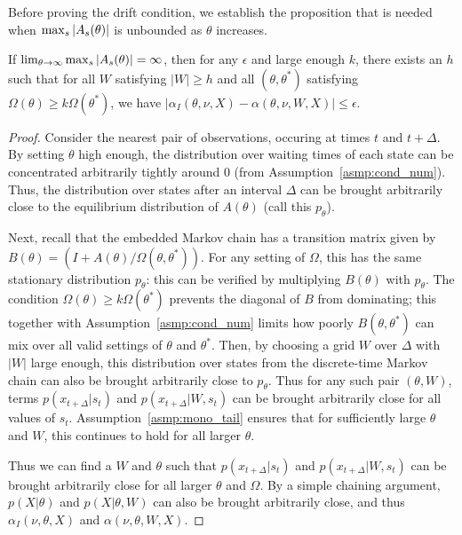 \noindent Before proving the drift condition, we establish the proposition that
is needed when ${\max_s |A_s(\theta)|}$ is unbounded as $\theta$ increases.
\begin{proposition}
  If $\lim_{\theta\rightarrow\infty} {\max_s |A_s(\theta)|} = \infty$, then 
for any $\epsilon$ and large enough $k$, there exists an $h$ such that for 
all $W$ satisfying $|W|\ge h$ and all $(\theta,\theta^*)$ satisfying
$\Omega(\theta) \ge k\Omega(\theta^*)$, we have 
$|\alpha_I(\theta,\nu,X) - \alpha(\theta,\nu,W,X)| \le \epsilon$.
\end{proposition}
\begin{proof}
  Consider the nearest pair of observations, occuring at times $t$ and 
  $t + \Delta$. %
  By setting $\theta$ high enough, the distribution over waiting times 
  of each state can be concentrated arbitrarily tightly around
  $0$ (from Assumption~\ref{asmp:cond_num}). Thus, the distribution over states after an 
  interval $\Delta$ can be brought arbitrarily close to the equilibrium 
  distribution of $A(\theta)$  (call this $p_{\theta}$).

  Next, recall that the embedded Markov chain has a transition matrix 
  given by $B(\theta) = (I + A(\theta)/\Omega(\theta,\theta^*))$. 
  For any setting of $\Omega$, this has the same stationary distribution 
  $p_{\theta}$: this can be verified by multiplying $B(\theta)$ with 
  $p_\theta$.
  The condition $\Omega(\theta) \ge k\Omega(\theta^*)$ prevents the
  diagonal of $B$ from dominating; this together with
  Assumption~\ref{asmp:cond_num} limits how poorly $B(\theta,\theta^*)$ 
  can mix over all valid settings of $\theta$ and $\theta^*$. Then,
  by choosing a grid $W$ over $\Delta$ with $|W|$ large enough, this 
  distribution over states from the discrete-time Markov chain can also be 
  brought arbitrarily close to $p_{\theta}$. Thus for any such pair 
  $(\theta,W)$, terms $p(x_{t+\Delta}|s_t)$ and $p(x_{t+\Delta}|W,s_t)$ 
  can be brought arbitrarily close for all values of $s_t$. 
  Assumption~\ref{asmp:mono_tail} ensures that
  for sufficiently large $\theta$ and $W$, this continues to hold for
  all larger $\theta$. 
 
  Thus we can find a $W$ and $\theta$ such that $p(x_{t+\Delta}|s_t)$ and 
  $p(x_{t+\Delta}|W,s_t)$ can be brought arbitrarily close for all larger
  $\theta$ and $\Omega$.  By a simple chaining argument, $p(X|\theta)$ and 
  $p(X|\theta,W)$ can also be brought arbitrarily close, and
  thus $\alpha_I(\nu,\theta,X)$ and $\alpha(\nu,\theta,W,X)$.
\end{proof}


